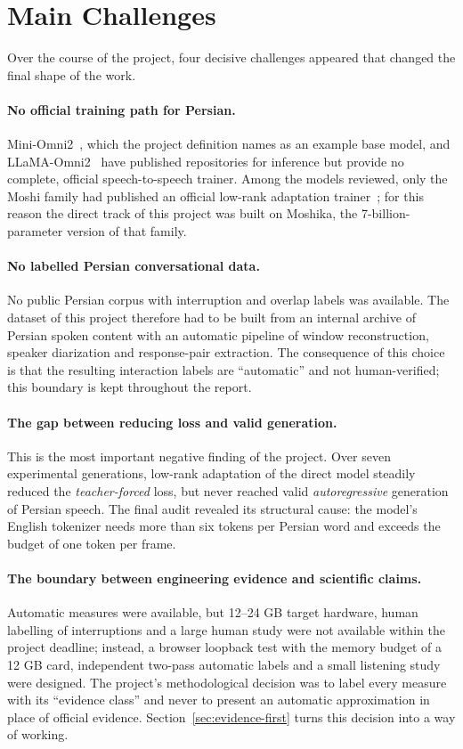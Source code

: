 \section{Main Challenges}
\label{sec:challenges}

Over the course of the project, four decisive challenges appeared that changed
the final shape of the work.

\paragraph{No official training path for Persian.}
Mini-Omni2~\cite{xie2024miniomni2}, which the project definition names as an
example base model, and LLaMA-Omni2~\cite{fang2025llamaomni2} have published
repositories for inference but provide no complete, official speech-to-speech
trainer. Among the models reviewed, only the Moshi family had published an
official low-rank adaptation trainer~\cite{moshifinetune2024}; for this reason
the direct track of this project was built on Moshika, the 7-billion-parameter
version of that family.

\paragraph{No labelled Persian conversational data.}
No public Persian corpus with interruption and overlap labels was available. The
dataset of this project therefore had to be built from an internal archive of
Persian spoken content with an automatic pipeline of window reconstruction,
speaker diarization and response-pair extraction. The consequence of this choice
is that the resulting interaction labels are ``automatic'' and not human-verified;
this boundary is kept throughout the report.

\paragraph{The gap between reducing loss and valid generation.}
This is the most important negative finding of the project. Over seven
experimental generations, low-rank adaptation of the direct model steadily
reduced the \emph{teacher-forced} loss, but never reached valid
\emph{autoregressive} generation of Persian speech. The final audit revealed its
structural cause: the model's English tokenizer needs more than six tokens per
Persian word and exceeds the budget of one token per frame.

\paragraph{The boundary between engineering evidence and scientific claims.}
Automatic measures were available, but 12--24 GB target hardware, human labelling
of interruptions and a large human study were not available within the project
deadline; instead, a browser loopback test with the memory budget of a 12 GB card,
independent two-pass automatic labels and a small listening study were designed.
The project's methodological decision was to label every measure with its
``evidence class'' and never to present an automatic approximation in place of
official evidence. Section~\ref{sec:evidence-first} turns this decision into a way
of working.

